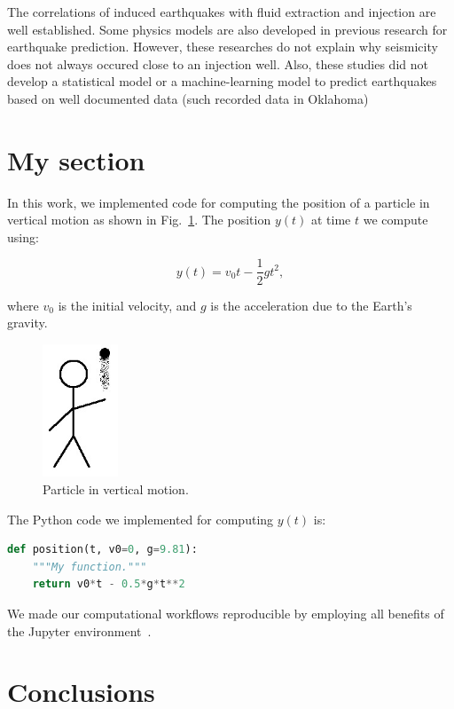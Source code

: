 \documentclass[project-plan]{report-template}
\begin{document}
The correlations of induced earthquakes with fluid extraction and injection are well established. 
Some physics models are also developed in previous research for earthquake prediction.
However, these researches do not explain why seismicity does not always occured close to an injection well.
Also, these studies did not develop a statistical model or a machine-learning model to predict earthquakes based on well documented data (such recorded data in Oklahoma)

\section{My section}
In this work, we implemented code for computing the position of a particle in vertical motion as shown in Fig.~\ref{fig:experiment}. The position $y(t)$ at time $t$ we compute using:

\begin{equation}
    \label{eq:vertical-position}
    y(t) = v_{0}t - \frac{1}{2}gt^{2},
\end{equation}

where $v_{0}$ is the initial velocity, and $g$ is the acceleration due to the Earth's gravity.

\begin{figure}
    \begin{center}
        \includegraphics[width=0.2\textwidth]{experiment.jpg}
    \end{center}
    \caption{\label{fig:experiment} Particle in vertical motion.}
\end{figure}

The Python code we implemented for computing $y(t)$ is:

\begin{lstlisting}[language=Python]
def position(t, v0=0, g=9.81):
    """My function."""
    return v0*t - 0.5*g*t**2
\end{lstlisting}

We made our computational workflows reproducible by employing all benefits of the Jupyter environment~\citep{Beg2021}.

\section*{Conclusions}
\blindtext[2]


\end{document}
